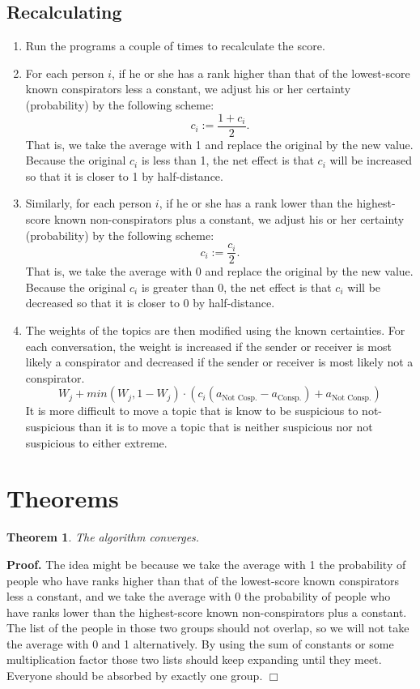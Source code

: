 \documentclass{icmmcm}
\newtheorem{Theo1}{Theorem}
\begin{document}
\subsection{Recalculating}
\begin{enumerate}

\item Run the programs a couple of times to recalculate
the score.

\item For each person $i$,
if he or she has a 
rank higher than that of the lowest-score known conspirators less a constant,
we adjust his or her certainty (probability) by the following scheme:
\[c_i := \frac{1 + c_i}{2}.\]
That is, we take the average with 1 and replace the original by the new value. 
Because the original $c_i$ is less than 1, the net effect is that
$c_i$ will be increased so that it is closer to 1 by half-distance.

\item Similarly,
for each person $i$,
if he or she has a 
rank lower than the highest-score known non-conspirators plus a constant,
we adjust his or her certainty (probability) by the following scheme:
\[c_i := \frac{c_i}{2}.\]
That is, we take the average with 0 and replace the original by the new value. 
Because the original $c_i$ is greater than 0, the net effect is that
$c_i$ will be decreased so that it is closer to 0 by half-distance.

\item The weights of the topics are then modified using the known certainties.  For each conversation, the weight is increased if the sender or receiver is most likely a conspirator and decreased if the sender or receiver is most likely not a conspirator. \[W_j + min(W_j,1-W_j) \cdot (c_i(a_{\text{Not Cosp.}}-a_{\text{Consp.}})+a_{\text{Not Consp.}})\] It is more difficult to move a topic that is know to be suspicious to not-suspicious than it is to move a topic that is neither suspicious nor not suspicious  to either extreme.  
\end{enumerate}
\section{Theorems}
\begin{Theo1}
The algorithm converges.
\end{Theo1}
{\bf Proof.}
The idea might be because we take the average with 1 the 
probability of people who have
ranks higher than that of the lowest-score known conspirators less a constant, and we
take the average with 0 the 
probability of people who have ranks lower than the highest-score known non-conspirators plus a constant.
The list of the people in those two groups should not overlap,
so we will not take the average with 0 and 1 alternatively.
By using the sum of constants or some multiplication factor
those two lists should keep expanding until they meet.
Everyone should be absorbed by exactly one group. 
\hfill $\Box$
\end{document}
